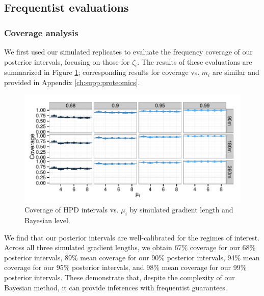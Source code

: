 \subsection{Frequentist evaluations}
\label{proteomics:sec:frequentist_evaluations}

\subsubsection{Coverage analysis}
\label{proteomics:sec:coverage}

We first used our simulated replicates to evaluate the frequency coverage of our posterior intervals, focusing on those for $\zeta_i$.
The results of these evaluations are summarized in Figure \ref{proteomics:fig:coverage_mu_hpd}; corresponding results for coverage vs. $m_i$ are similar and provided in Appendix \ref{ch:supp:proteomics}.
%
\ifx\nofigures\undefined
\begin{figure}
\centering
\includegraphics[width=\textwidth, page=1]{figures/proteomics/figures_coverage_sim}
\caption{Coverage of HPD intervals vs. $\mu_i$ by simulated gradient length and Bayesian level.
\label{proteomics:fig:coverage_mu_hpd}}
\end{figure}
\fi
%
We find that our posterior intervals are well-calibrated for the regimes of interest.
Across all three simulated gradient lengths, we obtain 67\% coverage for our 68\% posterior intervals, 89\% mean coverage for our 90\% posterior intervals, 94\% mean coverage for our 95\% posterior intervals, and 98\% mean coverage for our 99\% posterior intervals.
These demonstrate that, despite the complexity of our Bayesian method, it can provide inferences with frequentist guarantees.


